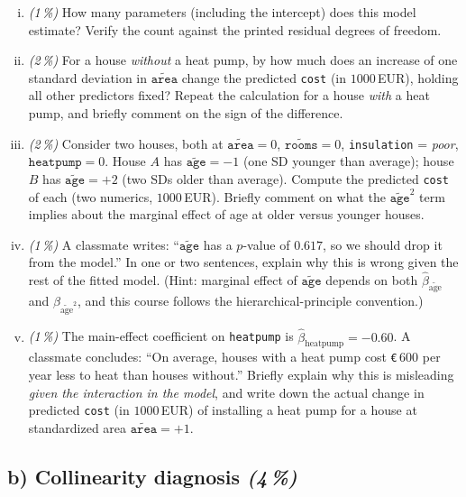 \documentclass[11pt,a4paper]{article}
\newcommand{\subpoints}[1]{\textit{(#1\,\%)}}
\begin{document}
\begin{enumerate}[(i)]
  \item \subpoints{1} How many parameters (including the intercept) does this model estimate? Verify the count against the printed residual degrees of freedom.
  \item \subpoints{2} For a house \emph{without} a heat pump, by how much does an increase of one standard deviation in $\widetilde{\texttt{area}}$ change the predicted \texttt{cost} (in $1000$\,EUR), holding all other predictors fixed? Repeat the calculation for a house \emph{with} a heat pump, and briefly comment on the sign of the difference.
  \item \subpoints{2} Consider two houses, both at $\widetilde{\texttt{area}} = 0$, $\widetilde{\texttt{rooms}} = 0$, \texttt{insulation} = \emph{poor}, $\texttt{heatpump} = 0$. House $A$ has $\widetilde{\texttt{age}} = -1$ (one SD younger than average); house $B$ has $\widetilde{\texttt{age}} = +2$ (two SDs older than average). Compute the predicted \texttt{cost} of each (two numerics, $1000$\,EUR). Briefly comment on what the $\widetilde{\texttt{age}}^2$ term implies about the marginal effect of age at older versus younger houses.
  \item \subpoints{1} A classmate writes: ``$\widetilde{\texttt{age}}$ has a $p$-value of $0.617$, so we should drop it from the model.'' In one or two sentences, explain why this is wrong given the rest of the fitted model. (Hint: marginal effect of $\widetilde{\texttt{age}}$ depends on both $\hat\beta_{\widetilde{\text{age}}}$ and $\hat\beta_{\widetilde{\text{age}}^2}$, and this course follows the hierarchical-principle convention.)
  \item \subpoints{1} The main-effect coefficient on \texttt{heatpump} is $\hat\beta_{\text{heatpump}} = -0.60$. A classmate concludes: ``On average, houses with a heat pump cost \texttt{€}\,$600$ per year less to heat than houses without.'' Briefly explain why this is misleading \emph{given the interaction in the model}, and write down the actual change in predicted \texttt{cost} (in $1000$\,EUR) of installing a heat pump for a house at standardized area $\widetilde{\texttt{area}} = +1$.
\end{enumerate}

\subsection*{b) Collinearity diagnosis \subpoints{4}}
\end{document}
